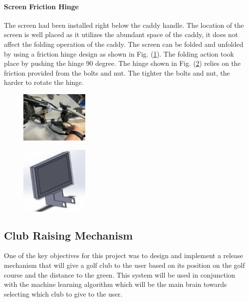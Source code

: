 \documentclass[11pt,landscape]{article}
\begin{document}
\begin{multicols}{3}
\paragraph{Screen Friction Hinge}
The screen had been installed right below the caddy handle. The location of the
screen is well placed as it utilizes the abundant space of the caddy, it does
not affect the folding operation of the caddy. The screen can be folded and
unfolded by using a friction hinge design as shown in Fig. (\ref{fig:fold}). The
folding action took place by pushing the hinge 90 degree. The hinge shown in
Fig. (\ref{fig:hinge}) relies on the friction provided from the bolts and nut. The
tighter the bolts and nut, the harder to rotate the hinge.

\begin{figure}[H]
    \begin{center}
        \includegraphics[width=0.3\textwidth]{caddy.png}
        \label{fig:fold}
    \end{center}
\end{figure}

\begin{figure}[H]
    \begin{center}
        \includegraphics[width=0.3\textwidth]{hinge.png}
        \label{fig:hinge}
    \end{center}
\end{figure}




\subsection{Club Raising Mechanism}
One of the key objectives for this project was to design and implement a release
mechanism that will give a golf club to the user based on its position on the
golf course and the distance to the green. This system will be used in
conjunction with the machine learning algorithm which will be the main brain
towards selecting which club to give to the user.


\end{multicols}
\end{document}
